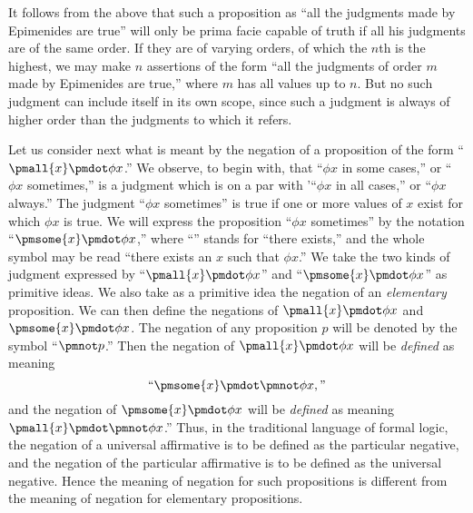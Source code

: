 \documentclass[letterpaper,12pt,openany,leqno]{book}
\newcommand{\pagefirst}[1]{\marginnote[\boxed{\text{#1}}]{\boxed{\text{#1}}}}
\begin{document}
It follows from the above that such a proposition as ``all the judgments made by Epimenides are true'' will only be prima facie capable of truth if all his judgments are of the same order. If they are of varying orders, of which the $n$th is the highest, we may make $n$ assertions of the form ``all the judgments of order $m$ made by Epimenides are true,'' where $m$ has all values \pagefirst{49} up to $n$. But no such judgment can include itself in its own scope, since such a judgment is always of higher order than the judgments to which it refers.

Let us consider next what is meant by the negation of a proposition of the form ``$\pmall{x} \pmdot \phi x$.'' We observe, to begin with, that ``$\phi x$ in some cases,'' or ``$\phi x$ sometimes,'' is a judgment which is on a par with '``$\phi x$ in all cases,'' or ``$\phi x$ always.'' The judgment ``$\phi x$ sometimes'' is true if one or more values of $x$ exist for which $\phi x$ is true. We will express the proposition ``$\phi x$ sometimes'' by the notation ``$\pmsome{x} \pmdot \phi x$,'' where ``'' stands for ``there exists,'' and the whole symbol may be read ``there exists an $x$ such that $\phi x$.'' We take the two kinds of judgment expressed by ``$\pmall{x} \pmdot \phi x$'' and ``$\pmsome{x} \pmdot \phi x$'' as primitive ideas. We also take as a primitive idea the negation of an \textit{elementary} proposition. We can then define the negations of $\pmall{x} \pmdot \phi x$ and $\pmsome{x} \pmdot \phi x$. The negation of any proposition $p$ will be denoted by the symbol ``$\pmnot p$.'' Then the negation of $\pmall{x} \pmdot \phi x$ will be \textit{defined} as meaning 
\[
	\text{``}\pmsome{x} \pmdot \pmnot \phi x,\text{''}
\]
and the negation of $\pmsome{x} \pmdot \phi x$ will be \textit{defined} as meaning $\pmall{x} \pmdot \pmnot \phi x$.'' Thus, in the traditional language of formal logic, the negation of a universal affirmative is to be defined as the particular negative, and the negation of the particular affirmative is to be defined as the universal negative. Hence the meaning of negation for such propositions is different from the meaning of negation for elementary propositions.
\end{document}
